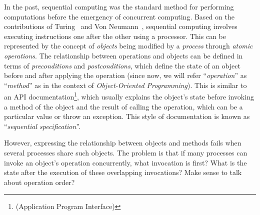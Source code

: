 In the past, sequential computing was the standard method for performing computations before the emergency of concurrent computing. Based on the contributions of  Turing~\cite{DBLP_journals_x_Turing37} and Von Neumann~\cite{DBLP_journals_annals_Neumann93}, sequential computing involves executing instructions one after the other using a processor. This can be represented by the concept of \textit{objects} being modified by a \textit{process} through \textit{atomic operations}. The relationship between operations and objects can be defined in terms of \textit{preconditions} and \textit{postconditions}, which define the state of an object before and after applying the operation (since now, we will refer ``\textit{operation}'' as ``\textit{method}'' as in the context of \textit{Object-Oriented Programming}). This is similar to an API documentation\footnote{(Application Program Interface)}, which usually explains the object's state before invoking a method of the object and the result of calling the operation, which can be a particular value or throw an exception. This style of documentation is known as ``\textit{sequential specification}''.

However, expressing the relationship between objects and methods fails when several processes share such objects. The problem is that if many processes can invoke an object's operation concurrently, what invocation is first? What is the state after the execution of these overlapping invocations? Make sense to talk about operation order?

